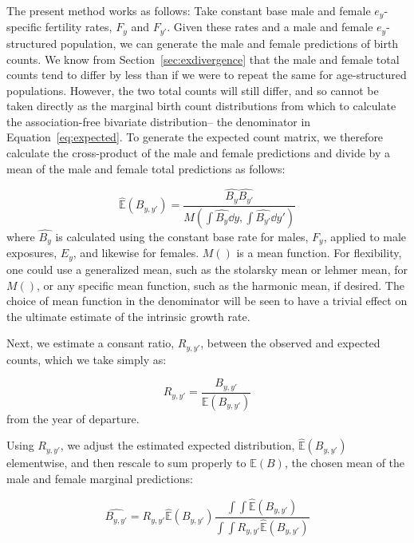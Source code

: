 
The present method works as follows: Take constant base male and female
$e_y$-specific fertility rates, $F_y$ and $F_{y'}$. Given these rates and a male
and female $e_y$-structured population, we can generate the male and female predictions of
birth counts. We know from Section~\ref{sec:exdivergence} that the male and
female total counts tend to differ by less than if we were to repeat the
same for age-structured populations. However, the two total counts will still
differ, and so cannot be taken directly as the marginal birth count distributions from
which to calculate the association-free bivariate distribution-- the denominator
in Equation~\eqref{eq:expected}. To generate the expected count matrix, we
therefore calculate the cross-product of the male and female predictions and
divide by a mean of the male and female total predictions as follows:

\begin{equation}
\label{eq:meanexp}
\widehat{\mathbb{E}}(B_{y,y'}) = \frac{\widehat{B_y} \widehat{B_{y'}}}{M(\int
\widehat{B_y} \dd y, \int \widehat{B_{y'}} \dd y')}
\end{equation}
where $\widehat{B_y}$ is calculated using the constant base rate for males,
$F_y$, applied to male exposures, $E_y$, and likewise for females. $M()$ is a
mean function. For flexibility, one could use a generalized mean, such as the
stolarsky mean or lehmer mean, for $M()$, or any specific mean function, such as
the harmonic mean, if desired. The choice of mean function in the denominator
will be seen to have a trivial effect on the ultimate estimate of the
intrinsic growth rate.

Next, we estimate a consant ratio, $R_{y,y'}$, between the
observed and expected counts, which we take simply as:

\begin{equation}
\label{eq:getR}
R_{y,y'} = \frac{B_{y,y'}}{\mathbb{E}(B_{y,y'})}
\end{equation}
from the year of departure.

Using $R_{y,y'}$, we adjust the estimated expected distribution,
$\widehat{\mathbb{E}}(B_{y,y'})$ elementwise, and then rescale to sum properly
to $\mathbb{E}(B)$, the chosen mean of the male and female marginal
predictions:

\begin{equation}
\label{eq:ratioadj}
\widehat{B_{y,y'}} = R_{y,y'}\widehat{\mathbb{E}}(B_{y,y'})\frac{\int \int
\widehat{\mathbb{E}}(B_{y,y'})}{\int \int
R_{y,y'}\widehat{\mathbb{E}}(B_{y,y'})}
\end{equation}

